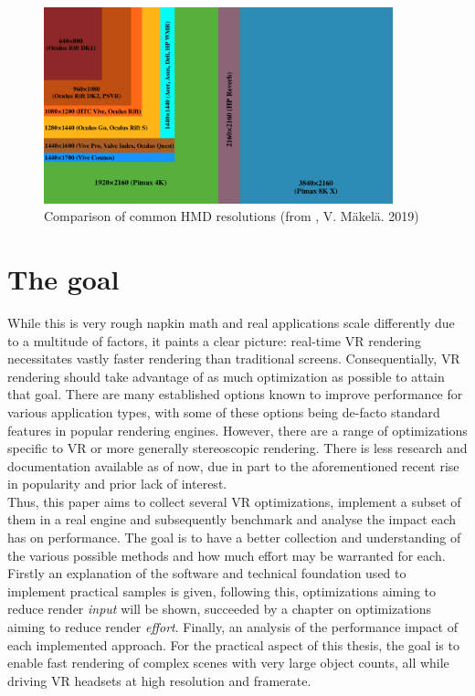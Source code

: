\begin{figure}[htb]
  \centering
  \includegraphics[width=0.9\textwidth]{pictures/VR_headset_resolution_per_eye_comparison}
  \caption{Comparison of common HMD resolutions (from \cite{VeikkoMakela.2019}, V. Mäkelä. 2019)} \label{fig:VR_HMD_res}
\end{figure} 

\section{The goal}
While this is very rough napkin math and real applications scale differently due to a multitude of factors, it paints a clear picture: real-time \gls{VR} rendering necessitates vastly faster rendering than traditional screens. Consequentially, \gls{VR} rendering should take advantage of as much optimization as possible to attain that goal. There are many established options known to improve performance for various application types, with some of these options being de-facto standard features in popular rendering engines.  However, there are a range of optimizations specific to \gls{VR} or more generally stereoscopic rendering. There is less research and documentation available as of now, due in part to the aforementioned recent rise in popularity and prior lack of interest. \\
Thus, this paper aims to collect several \gls{VR} optimizations, implement a subset of them in a real engine and subsequently benchmark and analyse the impact each has on performance. The goal is to have a better collection and understanding of the various possible methods and how much effort may be warranted for each. 
Firstly an explanation of the software and technical foundation used to implement practical samples is given, following this, optimizations aiming to reduce render \textit{input} will be shown, succeeded by a chapter on optimizations aiming to reduce render \textit{effort}. Finally, an analysis of the performance impact of each implemented approach. 
For the practical aspect of this thesis, the goal is to enable fast rendering of complex scenes with very large object counts, all while driving \gls{VR} headsets at high resolution and framerate. 

